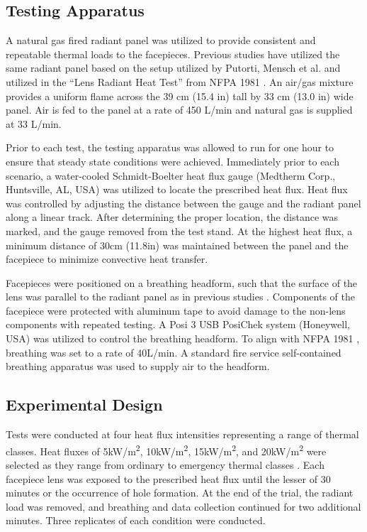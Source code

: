 \documentclass[sn-mathphys]{sn-jnl}%
\theoremstyle{thmstyleone}%
\theoremstyle{thmstyletwo}%
\theoremstyle{thmstylethree}%
\begin{document}
\subsection{Testing Apparatus}\label{subsec3}

A natural gas fired radiant panel was utilized to provide consistent and repeatable thermal loads to the facepieces. Previous studies have utilized the same radiant panel \cite{horn_study_2017,kesler_mechanical_2018} based on the setup utilized by Putorti, Mensch et al.\cite{putorti_thermal_2013} and utilized in the “Lens Radiant Heat Test” from NFPA 1981 \cite{national_fire_protection_association_nfpa_2013}. An \mbox{air/gas} mixture provides a uniform flame across the 39 cm (15.4 in) tall by 33 cm (13.0 in) wide panel. Air is fed to the panel at a rate of 450 L/min and natural gas is supplied at 33 L/min. 

Prior to each test, the testing apparatus was allowed to run for one hour to ensure that steady state conditions were achieved. Immediately prior to each scenario, a water-cooled Schmidt-Boelter heat flux gauge (Medtherm Corp., Huntsville, AL, USA) was utilized to locate the prescribed heat flux. Heat flux was controlled by adjusting the distance between the gauge and the radiant panel along a linear track. After determining the proper location, the distance was marked, and the gauge removed from the test stand. At the highest heat flux, a minimum distance of 30cm (11.8in) was maintained between the panel and the facepiece to minimize convective heat transfer. 

Facepieces were positioned on a breathing headform, such that the surface of the lens was parallel to the radiant panel as in previous studies \cite{putorti_thermal_2013,horn_study_2017,kesler_mechanical_2018}. Components of the facepiece were protected with aluminum tape to avoid damage to the non-lens components with repeated testing. A Posi 3 USB PosiChek system (Honeywell, USA) was utilized to control the breathing headform. To align with NFPA 1981 \cite{national_fire_protection_association_nfpa_2013}, breathing was set to a rate of 40L/min. A standard fire service self-contained breathing apparatus was used to supply air to the headform. 

\subsection{Experimental Design}\label{subsec4}
Tests were conducted at four heat flux intensities representing a range of thermal classes. Heat fluxes of 5kW/m\textsuperscript{2}, 10kW/m\textsuperscript{2}, 15kW/m\textsuperscript{2}, and 20kW/m\textsuperscript{2} were selected as they range from ordinary to emergency thermal classes \cite{utech_status_1973}. Each facepiece lens was exposed to the prescribed heat flux until the lesser of 30 minutes or the occurrence of hole formation. At the end of the trial, the radiant load was removed, and breathing and data collection continued for two additional minutes. Three replicates of each condition were conducted. 
\end{document}

